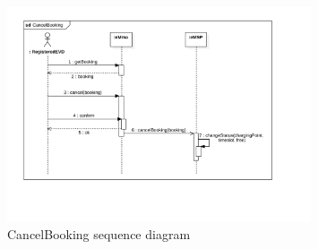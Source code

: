 \begin{figure}[H]
    \centering
    \includegraphics[width= 0.8\textwidth, trim={1.5cm 3.5cm 3cm 1cm}, clip]{Images/cp3/seqDiagrams/CancelBooking.pdf}
    \caption{CancelBooking sequence diagram}
\end{figure}

\clearpage
